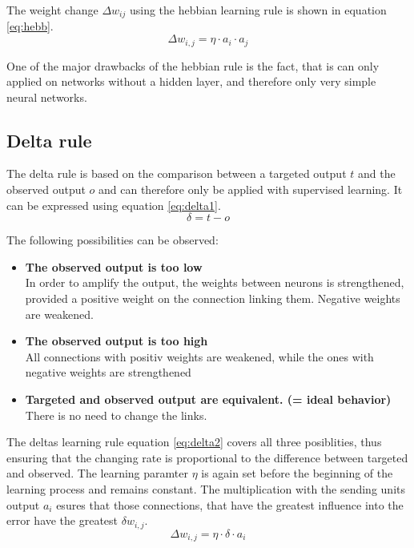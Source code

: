 \documentclass[10pt,a4paper,DIV=11]{scrreprt}
\begin{document}
The weight change $\Delta w_{ij}$ using the hebbian learning rule is shown in equation \eqref{eq:hebb}.
\begin{equation}
\Delta w_{i,j} = \eta \cdot a_i \cdot a_j
\label{eq:hebb}
\end{equation}

One of the major drawbacks of the hebbian rule is the fact, that is can only applied on networks without a hidden layer, and therefore only very simple neural networks.

\subsection{Delta rule}
The delta rule is based on the comparison between a targeted output $t$ and the observed output $o$ and can therefore only be applied with supervised learning.
It can be expressed using equation \eqref{eq:delta1}.
\begin{equation}
\delta = t - o
\label{eq:delta1}
\end{equation}

The following possibilities can be observed:
\begin{itemize}
\item \textbf{The observed output is too low}\\
In order to amplify the output, the weights between neurons is strengthened, provided a positive weight on the connection linking them. Negative weights are weakened.
\item \textbf{The observed output is too high}\\
All connections with positiv weights are weakened, while the ones with negative weights are strengthened 
\item \textbf{Targeted and observed output are equivalent. (= ideal behavior)}\\ There is no need to change the links.
\end{itemize}

The deltas learning rule equation \eqref{eq:delta2} covers all three posiblities, thus ensuring that the changing rate is proportional to the difference between targeted and observed. The learning paramter $\eta$ is again set before the beginning of the learning process and remains constant. The multiplication with the sending units output $a_i$ esures that those connections, that have the greatest influence into the error have the greatest $\delta w_{i,j}$.
\begin{equation}
\Delta w_{i,j} = \eta \cdot \delta \cdot a_i
\label{eq:delta2}
\end{equation}
\end{document}
